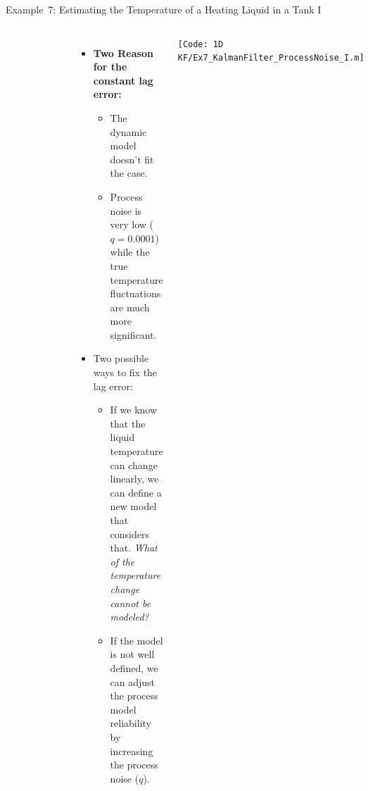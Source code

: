 \begin{frame}{Example~7: Estimating the Temperature of a Heating Liquid in a Tank I}
\begin{columns}
\begin{figure}
        \label{fig:ex7_KalmanFilter_ProcessNoise_I}
        \vspace{-10pt}
    \end{figure}
    \begin{itemize}
     \item \textbf{Two Reason for the constant lag error:}  
        \begin{itemize}
            \item The dynamic model doesn't fit the case.
            \item  Process noise is very low ($q=0.0001$) while the true temperature fluctuations are much more significant.
        \end{itemize}
        \item Two possible ways to fix the lag error:    
            \begin{itemize}
                \item If we know that the liquid temperature can change linearly, we can define a new model that considers that. \textit{What of the temperature change cannot be modeled?}
                \item If the model is not well defined, we can adjust the process model reliability by increasing the process noise ($q$).
            \end{itemize}
    \end{itemize}
            \texttt{\tiny [Code: 1D KF/Ex7\_KalmanFilter\_ProcessNoise\_I.m]}
\end{columns}
\end{frame}


